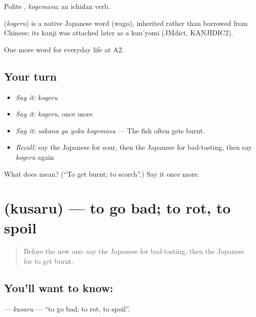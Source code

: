 Polite \textbf{}, \emph{kogemasu}; an ichidan verb.

\begin{cousinweb}
\textbf{} (\emph{kogeru}) is a native Japanese word (wago), inherited rather than borrowed from Chinese; its kanji was attached later as a kun'yomi (JMdict, KANJIDIC2).
\end{cousinweb}

\begin{grammarlens}[title={What you've built}]
One more word for everyday life at A2.
\end{grammarlens}

\subsection*{Your turn}
\begin{itemize}
\raggedright
  \item \emph{Say it:} \emph{kogeru}
  \item \emph{Say it:} \emph{kogeru}, once more
  \item \emph{Say it:} \emph{sakana ga yoku kogemasu} — The fish often gets burnt.
  \item \emph{Recall:} say the Japanese for sour, then the Japanese for bad-tasting, then say \emph{kogeru} again
\end{itemize}

\begin{tcolorbox}[breakable,colback=teal!4,colframe=teal!35!black,title={Before you move on}]
What does  mean? (\textquotedblleft{}To get burnt; to scorch\textquotedblright{}.) Say it once more.
\end{tcolorbox}
\section[\texorpdfstring{\ja{くさる} (kusaru)}{くさる (kusaru)}]{ (kusaru) — to go bad; to rot, to spoil}

\label{lesson:JA-C177-kusaru}



\begin{quote}
Before the new one: say the Japanese for bad-tasting, then the Japanese for to get burnt.
\end{quote}

\subsection*{You'll want to know: }
\textbf{} — \emph{kusaru} — \textquotedblleft{}to go bad; to rot, to spoil\textquotedblright{}.

